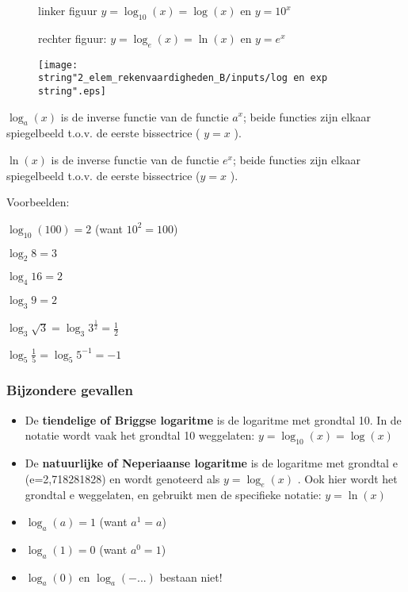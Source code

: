 \begin{figure}[h]
linker figuur ${\displaystyle y=\log_{10}\left(x\right)=\log(x)}$
en $y=10^{x}$ 

rechter figuur: ${\displaystyle y=\log_{e}\left(x\right)=\ln(x)}$
en $y=e^{x}$ 

\texttt{[image: \\string"2\_elem\_rekenvaardigheden\_B/inputs/log en exp\\string".eps]}
\end{figure}


\medskip{}


\noindent ${\displaystyle \log_{a}(x)}$ is de inverse functie van
de functie ${\displaystyle a^{x}}$; beide functies zijn elkaar spiegelbeeld
t.o.v. de eerste bissectrice ( $y=x$ ).

\noindent ${\displaystyle \ln(x)}$ is de inverse functie van de functie
${\displaystyle e^{x}}$; beide functies zijn elkaar spiegelbeeld
t.o.v. de eerste bissectrice ($y=x$ ).\medskip{}


Voorbeelden: 

${\displaystyle \log_{10}\left(100\right)}=2$ (want ${\displaystyle 10^{2}=100}$)

${\displaystyle \log_{2}8=3}$

${\displaystyle \log_{4}16=2}$

${\displaystyle \log_{3}9=2}$

${\displaystyle \log_{3}\sqrt{3}=\log_{3}3^{\frac{1}{2}}=\frac{1}{2}}$

${\displaystyle \log_{5}\frac{1}{5}=\log_{5}5^{-1}=-1}$


\subsubsection{Bijzondere gevallen}
\begin{itemize}
\item De \textbf{tiendelige of Briggse logaritme} is de logaritme met grondtal
10. In de notatie wordt vaak het grondtal 10 weggelaten: ${\displaystyle y=\log_{10}\left(x\right)}=\log\left(x\right)$
\item De \textbf{natuurlijke of Neperiaanse logaritme} is de logaritme met
grondtal e (e=2,718281828) en wordt genoteerd als ${\displaystyle y=\log_{e}}(x)$
. Ook hier wordt het grondtal e weggelaten, en gebruikt men de specifieke
notatie: ${\displaystyle y=\ln(x)}$
\item ${\displaystyle \log_{a}\left(a\right)=1}$ (want ${\displaystyle a^{1}=a}$)
\item ${\displaystyle \log_{a}\left(1\right)=0}$ (want ${\displaystyle a^{0}=1}$)
\item ${\displaystyle \log_{a}\left(0\right)}$ en ${\displaystyle \log_{a}\left(-...\right)}$
bestaan niet!
\end{itemize}

